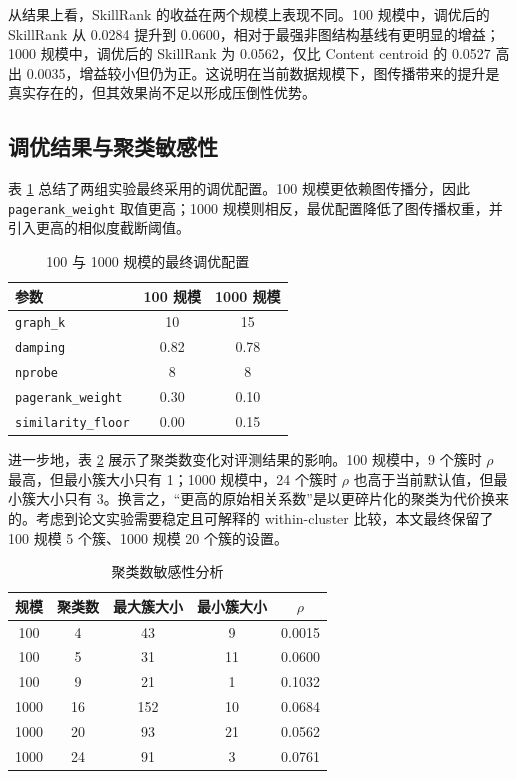 从结果上看，SkillRank 的收益在两个规模上表现不同。100 规模中，调优后的 SkillRank 从 0.0284 提升到 0.0600，相对于最强非图结构基线有更明显的增益；1000 规模中，调优后的 SkillRank 为 0.0562，仅比 Content centroid 的 0.0527 高出 0.0035，增益较小但仍为正。这说明在当前数据规模下，图传播带来的提升是真实存在的，但其效果尚不足以形成压倒性优势。

\subsection{调优结果与聚类敏感性}

表 \ref{tab:tuned_configs_real} 总结了两组实验最终采用的调优配置。100 规模更依赖图传播分，因此 \texttt{pagerank\_weight} 取值更高；1000 规模则相反，最优配置降低了图传播权重，并引入更高的相似度截断阈值。

\begin{table}[htbp]
\centering
\caption{100 与 1000 规模的最终调优配置}
\label{tab:tuned_configs_real}
\begin{tabular}{lcc}
\toprule
参数 & 100 规模 & 1000 规模 \\
\midrule
\texttt{graph\_k} & 10 & 15 \\
\texttt{damping} & 0.82 & 0.78 \\
\texttt{nprobe} & 8 & 8 \\
\texttt{pagerank\_weight} & 0.30 & 0.10 \\
\texttt{similarity\_floor} & 0.00 & 0.15 \\
\bottomrule
\end{tabular}
\end{table}

进一步地，表 \ref{tab:cluster_sensitivity_real} 展示了聚类数变化对评测结果的影响。100 规模中，9 个簇时 $\rho$ 最高，但最小簇大小只有 1；1000 规模中，24 个簇时 $\rho$ 也高于当前默认值，但最小簇大小只有 3。换言之，“更高的原始相关系数”是以更碎片化的聚类为代价换来的。考虑到论文实验需要稳定且可解释的 within-cluster 比较，本文最终保留了 100 规模 5 个簇、1000 规模 20 个簇的设置。

\begin{table}[htbp]
\centering
\caption{聚类数敏感性分析}
\label{tab:cluster_sensitivity_real}
\begin{tabular}{ccccc}
\toprule
规模 & 聚类数 & 最大簇大小 & 最小簇大小 & $\rho$ \\
\midrule
100 & 4 & 43 & 9 & 0.0015 \\
100 & 5 & 31 & 11 & 0.0600 \\
100 & 9 & 21 & 1 & 0.1032 \\
\midrule
1000 & 16 & 152 & 10 & 0.0684 \\
1000 & 20 & 93 & 21 & 0.0562 \\
1000 & 24 & 91 & 3 & 0.0761 \\
\bottomrule
\end{tabular}
\end{table}

